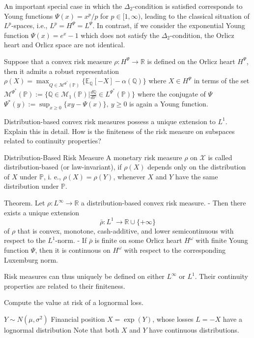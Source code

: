 An important special case in which the \(\Delta_2\)-condition is satisfied corresponds to Young functions \(\Psi(x) = x^p/p\) for \(p \in [1, \infty)\), 
leading to the classical situation of \(L^p\)-spaces, i.e.,
\(
L^p = H^\Psi = L^\Psi.
\)
In contrast, if we consider the exponential Young function \(\Psi(x) = e^x - 1\) which does not satisfy the \(\Delta_2\)-condition, 
the Orlicz heart and Orlicz space are not identical.

Suppose that a convex risk measure \(\rho : H^\Psi \to \mathbb{R}\) is defined on the Orlicz heart \(H^\Psi\), then it admits a robust representation
\(
\rho(X) = \max_{Q \in \mathcal{M}^{\Psi^\ast}(\mathbb{P})}\{\mathbb{E}_{\mathbb{Q}}[-X] - \alpha(\mathbb{Q})\}
\)
where \( X \in H^\Psi \)
in terms of the set
\(\mathcal{M}^{\Psi^\ast}(\mathbb{P}) := \{ \mathbb{Q} \in \mathcal{M}_1(\mathbb{P})| \frac{d\mathbb{Q}}{d\mathbb{P}} \in L^{\Psi^\ast}(\mathbb{P}) \}\)
where the conjugate of \( \Psi \)
\( \Psi^\ast(y) := \sup_{x \geq 0} \{ xy - \Psi(x) \},\ y\geq 0\)
is again a Young function.


Distribution-based convex risk measures possess a unique extension to \( L^1 \). Explain
this in detail. How is the finiteness of the risk measure on subspaces related to
continuity properties?

Distribution-Based Risk Measure
A monetary risk measure \(\rho\) on \(\mathcal{X}\) is called distribution-based (or law-invariant), if \( \rho(X) \) depends only on the distribution of \( X \) under \(\mathbb{P}\), i. e., \(\rho(X)=\rho(Y)\), whenever \( X \) and \( Y \) have the same distribution under \(\mathbb{P}\).

Theorem.
Let \(\rho:L^{\infty}\rightarrow\mathbb{R}\) a distribution-based convex risk measure. 
- Then there exists a unique extension 
\[\bar{\rho}:L^{1}\rightarrow\mathbb{R}\cup\{+\infty\}\]
   of \(\rho\) that is convex, monotone, cash-additive, and lower semicontinuous with respect to the \(L^{1}\)-norm.
- If \(\bar{\rho}\) is finite on some Orlicz heart \(H^{\omega}\) with finite Young function \(\Psi\), then it is continuous on \(H^{\omega}\) with respect to the corresponding Luxemburg norm.

Risk measures can thus uniquely be defined on either \(L^{\infty}\) or \(L^{1}\). Their continuity properties are related to their finiteness.


Compute the value at risk of a lognormal loss.


\(Y \sim N(\mu, \sigma^2)\)
Financial position \(X = \exp(Y)\), whose losses \(L = -X\) have a lognormal distribution
Note that both \(X\) and \(Y\) have continuous distributions.

